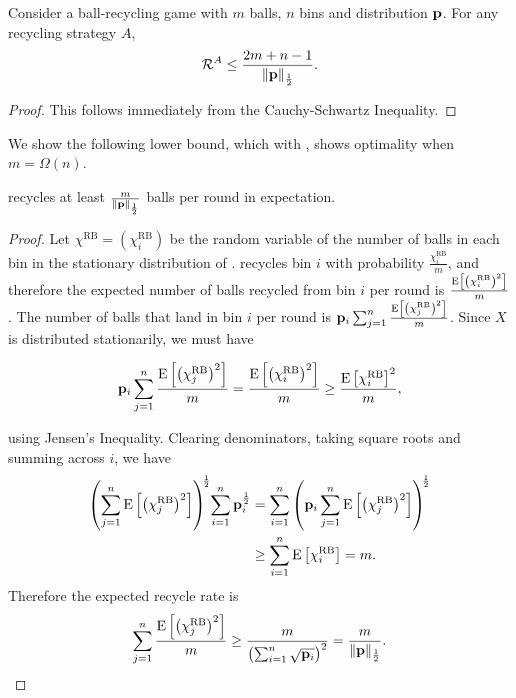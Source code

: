 \begin{lemma}\label{lem:upperbound}
	Consider a ball-recycling game with $m$ balls, $n$ bins and distribution
	$\mathbf{p}$. For any recycling strategy $A$, 
	\[\mathcal{R}^A \leq \frac{2m+n-1}{\|\mathbf{p}\|_{\frac{1}{2}}}.\]
\end{lemma}

\begin{proof}
	This follows immediately from the Cauchy-Schwartz Inequality.
\end{proof}


We show the following lower bound, which with , shows
optimality when $m = \Omega(n)$.

\begin{lemma}\label{lem:random-ball-lower}
	\RB recycles at least $\frac{m}{\|\mathbf{p}\|_{\frac{1}{2}}}$ balls per round in
	expectation. 
\end{lemma}

\begin{proof}
	Let $\chi^\mathrm{RB}=(\chi_i^\mathrm{RB})$ be the random variable of the
	number of balls in each bin in the stationary distribution of \RB.  \RB
	recycles bin $i$ with probability $\frac{\chi_i^\mathrm{RB}}{m}$, and
	therefore the expected number of balls recycled from bin $i$ per round is
	$\frac{\mathrm{E}\left[\left(\chi_i^\mathrm{RB}\right)^2\right]}{m}$. The number of balls that
	land in bin $i$ per round is
	$\mathbf{p}_i\sum_{j=1}^n\frac{\mathrm{E}\left[\left(\chi_j^\mathrm{RB}\right)^2\right]}{m}$.  Since
	$X$ is distributed stationarily, we must have

	\begin{equation*}
		\mathbf{p}_i\sum_{j=1}^n\frac{\mathrm{E}\left[\left(\chi_j^\mathrm{RB}\right)^2\right]}{m}
	= \frac{\mathrm{E}\left[\left(\chi_i^\mathrm{RB}\right)^2\right]}{m} \geq \frac{\mathrm{E}\left[\chi_i^\mathrm{RB}\right]^2}{m},
	\end{equation*}

	using Jensen's Inequality. Clearing denominators, taking square roots and
	summing across $i$, we have
	\begin{align*}
		\left(\sum_{j=1}^n \mathrm{E}\left[\left(\chi_j^\mathrm{RB}\right)^2\right]\right)^{\hspace*{-0.5ex}\frac{1}{2}} \hspace*{-0.5ex}\sum_{i=1}^n \mathbf{p}_i^\frac{1}{2}
		&= \sum_{i=1}^n \left( \mathbf{p}_i\sum_{j=1}^n {\mathrm{E}\left[\left(\chi_j^\mathrm{RB}\right)^2\right]} \right )^{\hspace*{-0.5ex}\frac{1}{2}} \\
		&\geq \sum_{i=1}^n \mathrm{E}\left[\chi_i^\mathrm{RB}\right] = m.
	\end{align*}
	Therefore the expected recycle rate is
	\[ \sum_{j=1}^n \frac{\mathrm{E}\left[\left(\chi_j^\mathrm{RB}\right)^2\right]}{m}
	\geq \frac{m}{\left(\sum_{i=1}^n \sqrt{\mathbf{p}_i}\right)^2}
	= \frac{m}{\|\mathbf{p}\|_{\frac{1}{2}}}. \]
\end{proof}

